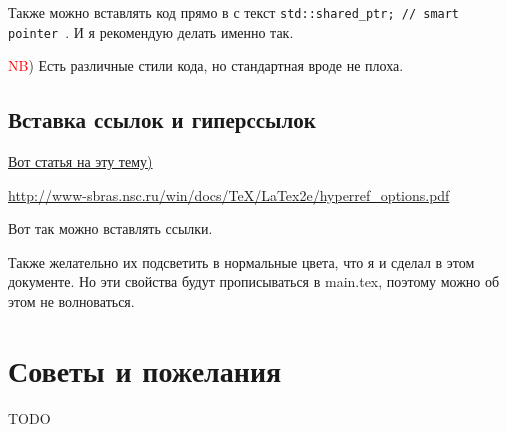 \documentclass[12pt]{article}
\begin{document}
Также можно вставлять код прямо в с текст \texttt{std::shared_ptr; // smart pointer }. И я рекомендую делать именно так.


\textcolor{red}{NB}) Есть различные стили кода, но стандартная вроде не плоха.

\subsection{Вставка ссылок и гиперссылок}

 \href{http://blog.harrix.org/article/661#h2_2}{Вот статья на эту тему)}


 \url{http://www-sbras.nsc.ru/win/docs/TeX/LaTex2e/hyperref_options.pdf}

 Вот так можно вставлять ссылки.


Также желательно их подсветить в нормальные цвета, что я и сделал в этом документе. Но эти свойства будут прописываться в main.tex, поэтому можно об этом не волноваться.


\section{Советы и пожелания}
 TODO
\end{document}
